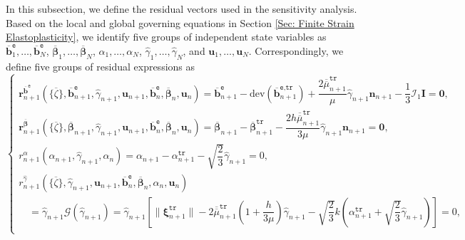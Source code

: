 \documentclass[preprint,11pt]{elsarticle}
\theoremstyle{definition}
\begin{document}
In this subsection, we define the residual vectors used in the sensitivity analysis. Based on the local and global governing equations in Section \ref{Sec: Finite Strain Elastoplasticity}, we identify five groups of independent state variables as $\overline{\mathbf{b}}_1^\texttt{e}, \ldots, \overline{\mathbf{b}}_N^\texttt{e}$, $\overline{\boldsymbol{\beta}}_1, \ldots, \overline{\boldsymbol{\beta}}_N$, $\alpha_1, \ldots, \alpha_N$, $\widehat{\gamma}_1, \ldots, \widehat{\gamma}_N$, and $\mathbf{u}_1, \ldots, \mathbf{u}_N$. Correspondingly, we define five groups of residual expressions as
\begin{equation} \label{Residual Expresssions}
    \left\{ \begin{array}{l}
        \mathbf{r}_{n+1}^{\overline{\mathbf{b}}^\texttt{e}}(\{\overline{\zeta}\}, \overline{\mathbf{b}}_{n+1}^\texttt{e}, \widehat{\gamma}_{n+1}, \mathbf{u}_{n+1}, \overline{\mathbf{b}}_n^\texttt{e}, \overline{\boldsymbol{\beta}}_n, \mathbf{u}_n) = \overline{\mathbf{b}}_{n+1}^\texttt{e} - \text{dev} \left( \overline{\mathbf{b}}_{n+1}^\texttt{e,tr} \right)
        + \dfrac{2 \overline{\overline{\mu}}_{n+1}^\texttt{tr}}{\mu} \widehat{\gamma}_{n+1} \mathbf{n}_{n+1} - \dfrac{1}{3} \mathcal{I}_1 \mathbf{I} = \mathbf{0}, \\[12pt]

        \mathbf{r}_{n+1}^{\overline{\boldsymbol{\beta}}}(\{\overline{\zeta}\}, \overline{\boldsymbol{\beta}}_{n+1}, \widehat{\gamma}_{n+1}, \mathbf{u}_{n+1}, \overline{\mathbf{b}}_n^\texttt{e}, \overline{\boldsymbol{\beta}}_n, \mathbf{u}_n)
        = \overline{\boldsymbol{\beta}}_{n+1} - \overline{\boldsymbol{\beta}}_{n+1}^\texttt{tr}
        - \dfrac{2 h \overline{\overline{\mu}}_{n+1}^\texttt{tr}}{3 \mu} \widehat{\gamma}_{n+1} \mathbf{n}_{n+1} = \mathbf{0}, \\[12pt]

        r_{n+1}^{\alpha}(\alpha_{n+1}, \widehat{\gamma}_{n+1}, \alpha_n) = \alpha_{n+1} - \alpha_{n+1}^\texttt{tr} - \sqrt{\dfrac{2}{3}} \widehat{\gamma}_{n+1} = 0, \\[12pt]
        
        r_{n+1}^{\widehat{\gamma}}(\{\overline{\zeta}\}, \widehat{\gamma}_{n+1}, \mathbf{u}_{n+1}, \overline{\mathbf{b}}_n^\texttt{e}, \overline{\boldsymbol{\beta}}_n, \alpha_n, \mathbf{u}_n) \\[12pt]
        \quad = \widehat{\gamma}_{n+1} \mathcal{G}(\widehat{\gamma}_{n+1})
        = \widehat{\gamma}_{n+1} \left[ \lVert \boldsymbol{\xi}_{n+1}^\texttt{tr} \rVert
        - 2 \overline{\overline{\mu}}_{n+1}^\texttt{tr}
        \left( 1 + \dfrac{h}{3\mu} \right) \widehat{\gamma}_{n+1}
        - \sqrt{\dfrac{2}{3}} k \left( \alpha_{n+1}^\texttt{tr} + \sqrt{\dfrac{2}{3}} \widehat{\gamma}_{n+1} \right) \right] = 0, \\[12pt]
        

\end{array}
\end{equation}
\end{document}
